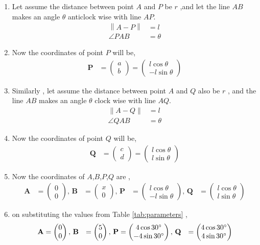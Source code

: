 \documentclass[11pt, a4paper]{article}
\newcommand{\myvec}[1]{\ensuremath{\begin{pmatrix}#1\end{pmatrix}}}
\let\vec\mathbf
\providecommand{\norm}[1]{\left\lVert#1\right\rVert}
\begin{document}
\begin{enumerate}
\begin{enumerate}
\item Let assume the distance between point $A$ and $P$ be $r$ ,and let the line $AB$ makes an angle $ \theta $ anticlock wise with line $AP$.
\begin{align}
	\norm{A-P} &= l \\
\angle PAB &= \theta
\end{align}

\item Now the coordinates of point $P$ will be,
\begin{align}
\vec{P} &= \myvec{ a \\ b } = \myvec{l \cos \theta \\ -l \sin \theta} 
\end{align}

\item Similarly , let assume the distance between point $A$ and $Q$ also be $r$ , and the line $AB$ makes an angle $\theta$ clock wise with line $AQ$.
\begin{align}
	\norm{A-Q} &= l \\
\angle QAB &= \theta 
\end{align}

\item Now the coordinates of point $Q$ will be,
\begin{align}
\vec{Q} &= \myvec{ c \\ d } = \myvec{l \cos \theta \\ l \sin \theta} 
\end{align}

\item Now the coordinates of $A$,$B$,$P$,$Q$ are ,
\begin{align}
\vec{A} &= \myvec{0 \\ 0},\,
\vec{B} &= \myvec{x \\ 0} ,\,
\vec{P} &= \myvec{l \cos \theta \\ -l \sin \theta} ,\,
\vec{Q} &= \myvec{l \cos \theta \\ l \sin \theta} 
\end{align}

\item on substituting the values from Table \ref{tab:parameters} ,
\begin{align}
\vec{A} &= \myvec{0 \\ 0},\,
\vec{B} &= \myvec{5 \\ 0} ,\,
\vec{P} &= \myvec{4 \cos 30 \degree \\ -4 \sin 30 \degree } ,\,
\vec{Q} &= \myvec{4 \cos 30 \degree \\ 4 \sin 30 \degree } 
\end{align}


\end{enumerate}
\end{enumerate}
\end{document}
